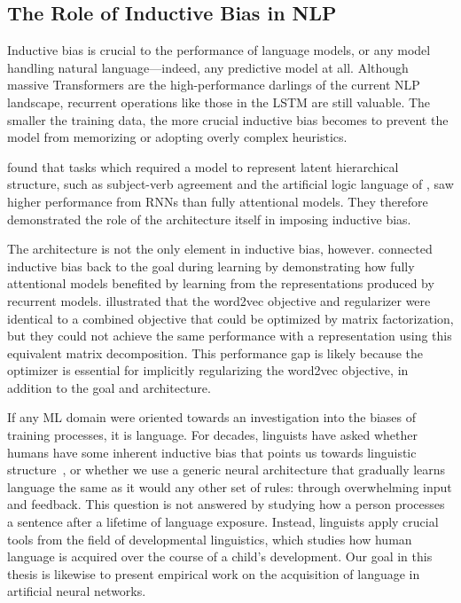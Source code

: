 \subsection{The Role of Inductive Bias in NLP}

Inductive bias is crucial to the performance of language models, or any model handling natural language---indeed, any predictive model at all. Although massive Transformers are the high-performance darlings of the current NLP landscape, recurrent operations like those in the LSTM are still valuable. The smaller the training data, the more crucial inductive bias becomes to prevent the model from memorizing  or adopting overly complex heuristics. 

\citet{tran_importance_2018} found that tasks which required a model to represent latent hierarchical structure, such as subject-verb agreement \citep{linzen_assessing_2016} and  the artificial logic language of \citet{bowman_tree-structured_2015}, saw higher performance from RNNs than fully attentional models. They therefore  demonstrated the role of the architecture itself in  imposing inductive bias.

The architecture is not the only element in inductive bias, however. \citet{abnar_transferring_2020}  connected inductive bias back to the goal during learning by demonstrating how fully attentional models benefited by learning from the representations produced by recurrent models. \citet{levy_neural_2014} illustrated that the word2vec \citep{mikolov_distributed_2013} objective and regularizer were identical to a combined objective that could be optimized by matrix factorization, but they could not achieve the same performance with a representation using this equivalent matrix decomposition. This performance gap is likely because the optimizer is essential for implicitly regularizing the word2vec objective, in addition to the goal and architecture.

If any ML domain were oriented towards an investigation into the biases of training processes, it is language. For decades, linguists have asked whether humans have some inherent inductive bias that points us towards linguistic structure~\citep{chomsky_language_1988}, or whether we use a generic neural architecture that gradually learns language the same as it would any other set of rules: through overwhelming input and feedback. This question is not answered by studying how a person processes a sentence after a lifetime of language exposure. Instead, linguists apply crucial tools from the field of developmental linguistics, which studies how human language is acquired over the course of a child's development. Our goal in this thesis is likewise to present empirical work on the acquisition of language in artificial neural networks.


